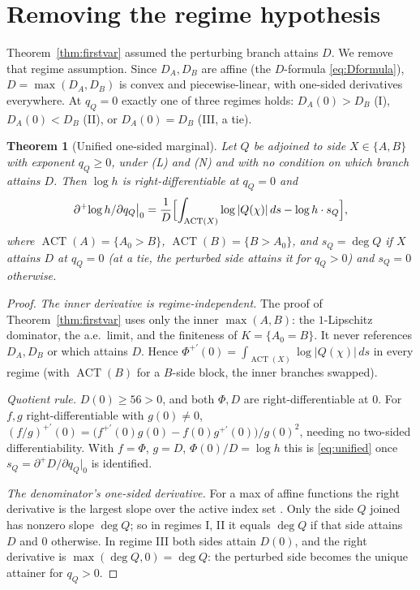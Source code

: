 \documentclass[11pt,reqno]{amsart}
\theoremstyle{plain}
\newtheorem{theorem}{Theorem}
\theoremstyle{definition}
\newcommand{\dplus}{\partial^{+}}
\newcommand{\dA}{D_A}
\newcommand{\dB}{D_B}
\DeclareMathOperator{\ACT}{ACT}
\begin{document}
\section{Removing the regime hypothesis}\label{sec:unified}

Theorem~\ref{thm:firstvar} assumed the perturbing branch attains $D$. We
remove that regime assumption. Since $\dA,\dB$ are affine (the $D$-formula \eqref{eq:Dformula}),
$D=\max(\dA,\dB)$ is convex and piecewise-linear, with one-sided derivatives
everywhere. At $q_Q=0$ exactly one of three regimes holds:
$\dA(0)>\dB$ (I), $\dA(0)<\dB$ (II), or $\dA(0)=\dB$ (III, a tie).

\begin{theorem}[Unified one-sided marginal]\label{thm:unified}
Let $Q$ be adjoined to side $X\in\{A,B\}$ with exponent $q_Q\ge0$, under
\emph{(L)} and \emph{(N)} and with no condition on which branch attains $D$. Then
$\log h$ is right-differentiable at $q_Q=0$ and
\begin{equation}\label{eq:unified}
  \dplus\!\log h/\partial q_Q\big|_0
  =\frac1D\Bigl[\int_{\ACT(X)}\log|Q(\chi)|\,ds-\log h\cdot s_Q\Bigr],
\end{equation}
where $\ACT(A)=\{A_0>B\}$, $\ACT(B)=\{B>A_0\}$, and $s_Q=\deg Q$ if $X$ attains $D$ at
$q_Q=0$ (at a tie, the perturbed side attains it for $q_Q>0$) and $s_Q=0$ otherwise.
\end{theorem}

\begin{proof}
\emph{The inner derivative is regime-independent.} The proof of
Theorem~\ref{thm:firstvar} uses only the inner $\max(A,B)$: the $1$-Lipschitz
dominator, the a.e.\ limit, and the finiteness of $K=\{A_0=B\}$. It never references
$\dA,\dB$ or which attains $D$. Hence
$\Phi^{+\prime}(0)=\int_{\ACT(X)}\log|Q(\chi)|\,ds$ in every regime (with $\ACT(B)$
for a $B$-side block, the inner branches swapped).

\emph{Quotient rule.} $D(0)\ge56>0$, and both $\Phi,D$ are right-differentiable at
$0$. For $f,g$ right-differentiable with $g(0)\ne0$,
$(f/g)^{+\prime}(0)=\bigl(f^{+\prime}(0)g(0)-f(0)g^{+\prime}(0)\bigr)/g(0)^2$, needing
no two-sided differentiability. With $f=\Phi$, $g=D$, $\Phi(0)/D=\log h$ this is
\eqref{eq:unified} once $s_Q=\dplus D/\partial q_Q|_0$ is identified.

\emph{The denominator's one-sided derivative.} For a max of affine functions the
right derivative is the largest slope over the active index set
\citep[Thm.~23.4]{Roc70}. Only the side $Q$ joined has nonzero slope $\deg Q$; so in
regimes I, II it equals $\deg Q$ if that side attains $D$ and $0$ otherwise. In
regime III both sides attain $D(0)$, and the right derivative is $\max(\deg Q,0)=\deg
Q$: the perturbed side becomes the unique attainer for $q_Q>0$.
\end{proof}
\end{document}
